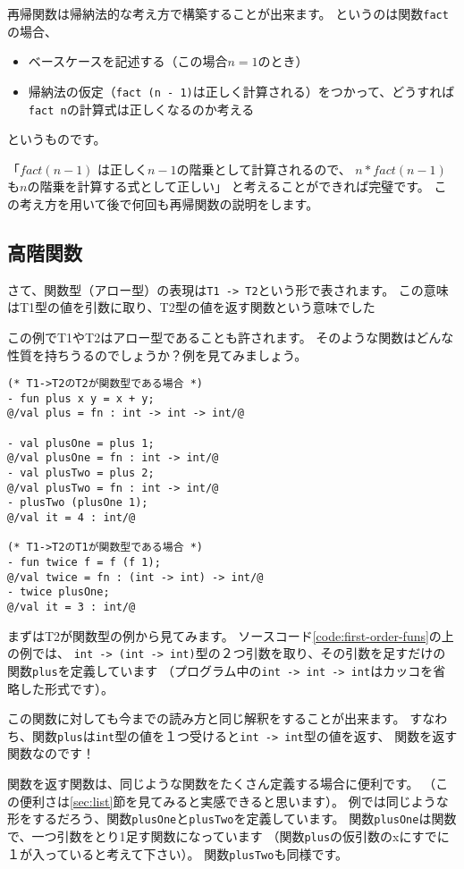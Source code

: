 \documentclass[11pt,a4paper]{article}
\begin{document}
再帰関数は帰納法的な考え方で構築することが出来ます。
というのは関数\lstinline{fact}の場合、
\begin{itemize}
\item ベースケースを記述する（この場合$n=1$のとき）
\item 帰納法の仮定（\lstinline{fact (n - 1)}は正しく計算される）をつかって、どうすれば\lstinline{fact n}の計算式は正しくなるのか考える
\end{itemize}
というものです。

「$fact (n - 1)$ は正しく$n - 1$の階乗として計算されるので、
$n * fact (n - 1)$も$n$の階乗を計算する式として正しい」
と考えることができれば完璧です。
この考え方を用いて後で何回も再帰関数の説明をします。

\subsection{高階関数}
さて、関数型（アロー型）の表現は\lstinline{T1 -> T2}という形で表されます。
この意味はT1型の値を引数に取り、T2型の値を返す関数という意味でした

この例でT1やT2はアロー型であることも許されます。
そのような関数はどんな性質を持ちうるのでしょうか？例を見てみましょう。

\begin{lstlisting}[caption=第一級関数,label=code:first-order-funs]
(* T1->T2のT2が関数型である場合 *)
- fun plus x y = x + y;
@/val plus = fn : int -> int -> int/@

- val plusOne = plus 1;
@/val plusOne = fn : int -> int/@
- val plusTwo = plus 2;
@/val plusTwo = fn : int -> int/@
- plusTwo (plusOne 1);
@/val it = 4 : int/@

(* T1->T2のT1が関数型である場合 *)
- fun twice f = f (f 1);
@/val twice = fn : (int -> int) -> int/@
- twice plusOne;
@/val it = 3 : int/@
\end{lstlisting}

まずはT2が関数型の例から見てみます。
ソースコード\ref{code:first-order-funs}の上の例では、
\lstinline{int -> (int -> int)}型の２つ引数を取り、その引数を足すだけの関数\lstinline{plus}を定義しています
（プログラム中の\lstinline{int -> int -> int}はカッコを省略した形式です）。

この関数に対しても今までの読み方と同じ解釈をすることが出来ます。
すなわち、関数\lstinline{plus}は\lstinline{int}型の値を１つ受けると\lstinline{int -> int}型の値を返す、
関数を返す関数なのです！

関数を返す関数は、同じような関数をたくさん定義する場合に便利です。
（この便利さは\ref{sec:list}節を見てみると実感できると思います）。
例では同じような形をするだろう、関数\lstinline{plusOne}と\lstinline{plusTwo}を定義しています。
関数\lstinline{plusOne}は関数で、一つ引数をとり1足す関数になっています
（関数\lstinline{plus}の仮引数のxにすでに１が入っていると考えて下さい）。
関数\lstinline{plusTwo}も同様です。
\end{document}
